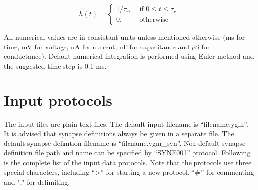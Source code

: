 \documentclass{article}
\begin{document}
\begin{equation}
h(t) = 
\begin{cases}
1/\tau_{r},& \text{ if } 0\leq t \leq \tau_{r}\\
0,& \text{ otherwise}
\end{cases}
\end{equation}


All numerical values are in consistant units unless mentioned otherwise (ms for time, mV for voltage, nA for current, nF for capacitance and ${\mu}$S for conductance). 
Default numerical integration is performed using Euler method and the suggested time-step is 0.1 ms\cite{litwin2012slow}.



%	




\section{Input protocols}
\label{sec:Input protocols}

The input files are plain text files.
The default input filename is ``filename.ygin''.
It is advised that synapse definitions always be given in a separate file.
The default synapse definition filename is ``filename.ygin\_syn''.
Non-default synapse definition file path and name can be specified by ``SYNF001'' protocol.
Following is the complete list of the input data protocols.
Note that the protocols use three special characters, including ``\textgreater'' for starting a new protocol, ``\#'' for commenting and "," for delimiting.
\end{document}
